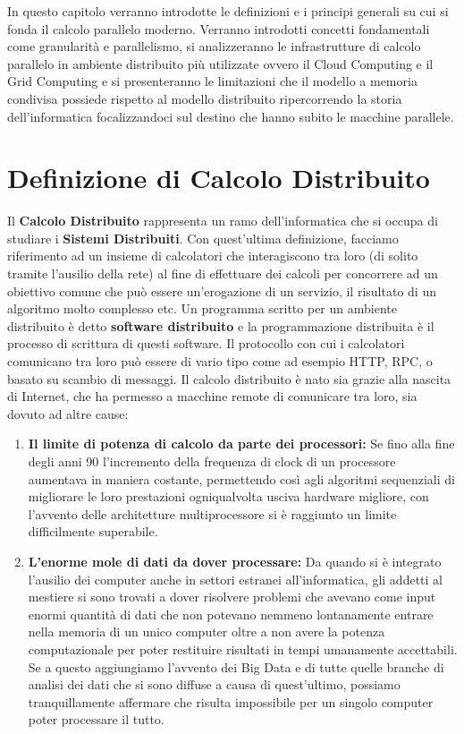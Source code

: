 In questo capitolo verranno introdotte le definizioni e i principi generali su cui si fonda il calcolo parallelo moderno. Verranno introdotti concetti fondamentali come granularità e parallelismo, si analizzeranno le infrastrutture di calcolo parallelo in ambiente distribuito più utilizzate ovvero il Cloud Computing e il Grid Computing e si presenteranno le limitazioni che il modello a memoria condivisa possiede rispetto al modello distribuito ripercorrendo la storia dell'informatica focalizzandoci sul destino che hanno subito le macchine parallele.
\section{Definizione di Calcolo Distribuito}
Il \textbf{Calcolo Distribuito} rappresenta un ramo dell'informatica che si occupa di studiare i \textbf{Sistemi Distribuiti}. Con quest'ultima definizione, facciamo riferimento ad un insieme di calcolatori che interagiscono tra loro (di solito tramite l'ausilio della rete) al fine di effettuare dei calcoli per concorrere ad un obiettivo comune che può essere un'erogazione di un servizio, il risultato di un algoritmo molto complesso etc. Un programma scritto per un ambiente distribuito è detto \textbf{software distribuito} e la programmazione distribuita è il processo di scrittura di questi software. Il protocollo con cui i calcolatori comunicano tra loro può essere di vario tipo come ad esempio HTTP, RPC, o basato su scambio di messaggi. Il calcolo distribuito è nato sia grazie alla nascita di Internet, che ha permesso a macchine remote di comunicare tra loro, sia dovuto ad altre cause:
\begin{enumerate}
  \item \textbf{Il limite di potenza di calcolo da parte dei processori:} Se fino alla fine degli anni 90 l'incremento della frequenza di clock di un processore aumentava in maniera costante, permettendo così agli algoritmi sequenziali di migliorare le loro prestazioni ogniqualvolta usciva hardware migliore, con l'avvento delle architetture multiprocessore si è raggiunto un limite difficilmente superabile.
  \item \textbf{L'enorme mole di dati da dover processare:} Da quando si è integrato l'ausilio dei computer anche in settori estranei all'informatica, gli addetti al mestiere si sono trovati a dover risolvere problemi che avevano come input enormi quantità di dati che non potevano nemmeno lontanamente entrare nella memoria di un unico computer oltre a non avere la potenza computazionale per poter restituire risultati in tempi umanamente accettabili. Se a questo aggiungiamo l'avvento dei Big Data e di tutte quelle branche di analisi dei dati che si sono diffuse a causa di quest'ultimo, possiamo tranquillamente affermare che risulta impossibile per un singolo computer poter processare il tutto. 
\end{enumerate}
